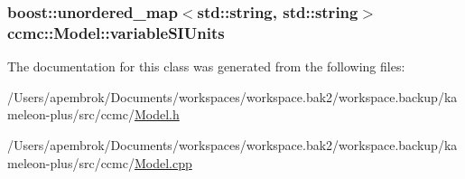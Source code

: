 \hypertarget{classccmc_1_1_model_af782a4c86004df7b9388562551ae87ad}{
\subsubsection[{variable\-S\-I\-Units}]{\setlength{\rightskip}{0pt plus 5cm}boost\-::unordered\-\_\-map$<$std\-::string, std\-::string$>$ ccmc\-::\-Model\-::variable\-S\-I\-Units\hspace{0.3cm}{\ttfamily [protected]}}}\label{classccmc_1_1_model_af782a4c86004df7b9388562551ae87ad}


The documentation for this class was generated from the following files\-:\begin{DoxyCompactItemize}
\item 
/\-Users/apembrok/\-Documents/workspaces/workspace.\-bak2/workspace.\-backup/kameleon-\/plus/src/ccmc/\hyperlink{_model_8h}{Model.\-h}\item 
/\-Users/apembrok/\-Documents/workspaces/workspace.\-bak2/workspace.\-backup/kameleon-\/plus/src/ccmc/\hyperlink{_model_8cpp}{Model.\-cpp}\end{DoxyCompactItemize}
